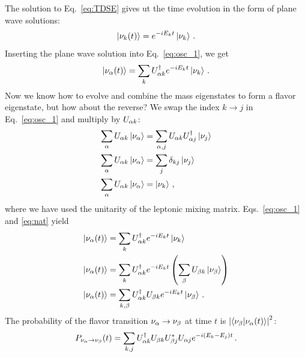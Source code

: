 The solution to Eq.~\ref{eq:TDSE} gives ut the time evolution
in the form of plane wave solutions: 
\begin{align}
    \ket{\nu_k(t)} = e^{-iE_kt}\ket{\nu_k}\,.
\end{align}
Inserting the plane wave solution into Eq.~\ref{eq:osc_1}, we get 
\begin{align}\label{eq:nat}
    \ket{\nu_\alpha(t)} = \sum_k U^\dagger_{\alpha k} e^{-iE_kt}\ket{\nu_k}\,.
\end{align}
Now we know how to evolve and combine the mass eigenstates to form a flavor eigenstate, but how about the reverse?
 We swap the index $k\to j$ in Eq.~\ref{eq:osc_1} and multiply by $U_{\alpha k}$:
\begin{align}\label{eq:osc_k}
    \sum_\alpha U_{\alpha k}\ket{\nu_\alpha} &= \sum_{\alpha, j} U_{\alpha k} U_{\alpha j}^\dagger \ket{\nu_j} \nonumber \\
    \sum_\alpha U_{\alpha k}\ket{\nu_\alpha} &= \sum_{j} \delta_{kj} \ket{\nu_j} \nonumber \\
    \sum_\alpha U_{\alpha k}\ket{\nu_\alpha} &= \ket{\nu_k}\,,
\end{align}
where we have used the unitarity of the leptonic mixing matrix. Eqs.~\ref{eq:osc_1} and \ref{eq:nat} yield 
\begin{align}
    \ket{\nu_\alpha(t)} &= \sum_k U^\dagger_{\alpha k} e^{-iE_kt}\ket{\nu_k} \nonumber \\
    \ket{\nu_\alpha(t)} &= \sum_k U^\dagger_{\alpha k} e^{-iE_kt}\left(\sum_\beta U_{\beta k}\ket{\nu_\beta}\right) \nonumber \\
    \ket{\nu_\alpha(t)} &= \sum_{k,\beta} U^\dagger_{\alpha k}U_{\beta k} e^{-iE_kt} \ket{\nu_\beta}\,.
\end{align}
The probability of the flavor transition $\nu_\alpha \to \nu_\beta$ at time $t$ is $\abs{\bra{\nu_\beta}\ket{\nu_\alpha (t)}}^2$:
\begin{align}
    P_{\nu_\alpha \to \nu_\beta}(t) = \sum_{k,j} U^\dagger_{\alpha k}U_{\beta k}U^*_{\beta j}U_{\alpha j} e^{-i(E_k-E_j)t}\,.
\end{align}

